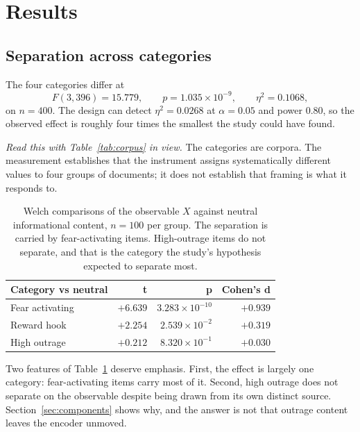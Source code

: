 \documentclass[preprint,12pt]{elsarticle}
\begin{document}
\section{Results}
\label{sec:results}

\subsection{Separation across categories}

The four categories differ at
\begin{equation}
F(3, 396) = 15.779, \qquad p = 1.035\times10^{-9}, \qquad \eta^2 = 0.1068,
\end{equation}
on $n = 400$. The design can detect $\eta^2 = 0.0268$ at $\alpha = 0.05$ and power $0.80$, so
the observed effect is roughly four times the smallest the study could have found.

\emph{Read this with Table~\ref{tab:corpus} in view.} The categories are corpora. The
measurement establishes that the instrument assigns systematically different values to four
groups of documents; it does not establish that framing is what it responds to.

\begin{table}[htbp]
\centering
\begin{tabular}{@{}lrrr@{}}
\toprule
\textbf{Category vs neutral} & \textbf{t} & \textbf{p} & \textbf{Cohen's d} \\
\midrule
Fear activating & $+6.639$ & $3.283\times 10^{-10}$ & $+0.939$ \\
Reward hook     & $+2.254$ & $2.539\times 10^{-2}$  & $+0.319$ \\
High outrage    & $+0.212$ & $8.320\times 10^{-1}$  & $+0.030$ \\
\bottomrule
\end{tabular}
\caption{Welch comparisons of the observable $X$ against neutral informational content,
$n = 100$ per group. The separation is carried by fear-activating items. High-outrage items do
not separate, and that is the category the study's hypothesis expected to separate most.}
\label{tab:welch}
\end{table}

Two features of Table~\ref{tab:welch} deserve emphasis. First, the effect is largely one
category: fear-activating items carry most of it. Second, high outrage does not separate on
the observable despite being drawn from its own distinct source. Section~\ref{sec:components}
shows why, and the answer is not that outrage content leaves the encoder unmoved.
\end{document}

